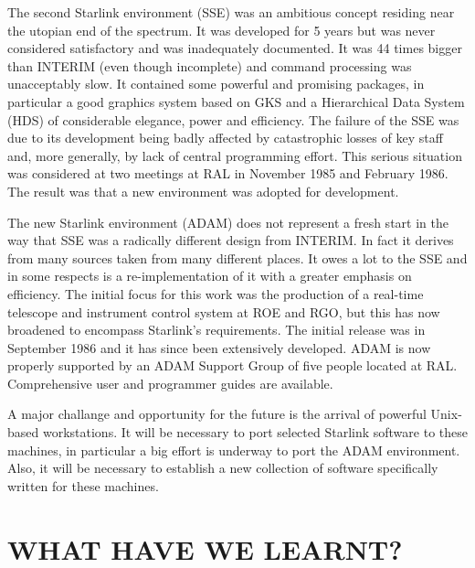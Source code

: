 The second Starlink environment (SSE) was an ambitious concept residing near the
utopian end of the spectrum.
It was developed for 5 years but was never considered satisfactory and was
inadequately documented.
It was 44 times bigger than INTERIM (even though incomplete) and command
processing was unacceptably slow.
It contained some powerful and promising packages, in particular a good graphics
system based on GKS and a Hierarchical Data System (HDS) of considerable
elegance, power and efficiency.
The failure of the SSE was due to its development being badly affected by
catastrophic losses of key staff and, more generally, by lack of central
programming effort.
This serious situation was considered at two meetings at RAL in November 1985
and February 1986.
The result was that a new environment was adopted for development.

The new Starlink environment (ADAM) does not represent a fresh start
in the way that SSE was a radically different design from INTERIM.
In fact it derives from many sources taken from many different places.
It owes a lot to the SSE and in some respects is a re-implementation of it with
a greater emphasis on efficiency.
The initial focus for this work was the production of a real-time telescope and
instrument control system at ROE and RGO, but this has now broadened to
encompass Starlink's requirements.
The initial release was in September 1986 and it has since been extensively
developed.
ADAM is now properly supported by an ADAM Support Group of five people located
at RAL.
Comprehensive user and programmer guides are available.

A major challange and opportunity for the future is the arrival of powerful
Unix-based workstations.
It will be necessary to port selected Starlink software to these machines, in
particular a big effort is underway to port the ADAM environment.
Also, it will be necessary to establish a new collection of software
specifically written for these machines.

\section {WHAT HAVE WE LEARNT?}

